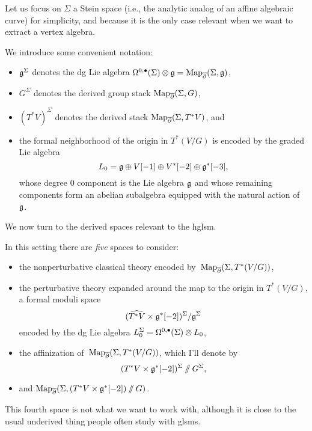 \documentclass[11pt]{amsart}
\begin{document}
Let us focus on $\Sigma$ a Stein space (i.e., the analytic analog of an affine algebraic curve) 
for simplicity, and because it is the only case relevant when we want to extract a vertex algebra.

We introduce some convenient notation:
\begin{itemize}
\item $\mathfrak g^\Sigma$ denotes the dg Lie algebra $\Omega^{0,\bullet}(\Sigma) \otimes \mathfrak g = {\rm Map}_{\overline{\partial}}(\Sigma,\mathfrak g)$,
\item $G^\Sigma$ denotes the derived group stack ${\rm Map}_{\overline{\partial}}(\Sigma,G)$, 
\item $(T^*V)^\Sigma$ denotes the derived stack ${\rm Map}_{\overline{\partial}}(\Sigma,T^*V)$,
and
\item the formal neighborhood of the origin in $T^*(V/G)$ is encoded by the graded Lie algebra
\[
L_0 = \mathfrak g \oplus V[-1] \oplus V^*[-2] \oplus \mathfrak g^*[-3],
\] 
whose degree 0 component is the Lie algebra $\mathfrak g$ and whose remaining components form an abelian subalgebra equipped with the natural action of~$\mathfrak g$.
\end{itemize}
We now turn to the derived spaces relevant to the hglsm.

In this setting there are {\em five} spaces to consider:
\begin{itemize}
\item the nonperturbative classical theory encoded by~${\rm Map}_{\overline{\partial}}(\Sigma, T^*(V/G))$,
\item the perturbative theory expanded around the map to the origin in $T^*(V/G)$, 
a formal moduli space 
\[
(\widehat{T^* V} \times \mathfrak g^*[-2])^\Sigma/\mathfrak g^\Sigma
\] 
encoded by the dg Lie algebra $L_0^\Sigma = \Omega^{0,\bullet}(\Sigma) \otimes L_0$, 
\item the affinization of~${\rm Map}_{\overline{\partial}}(\Sigma, T^*(V/G))$, which I'll denote by 
\[
(T^*V \times \mathfrak g^*[-2])^\Sigma \mathbin{/\mkern-6mu/} G^\Sigma,
\]
\item and ${\rm Map}_{\overline{\partial}}(\Sigma,(T^*V \times \mathfrak g^*[-2])\mathbin{/\mkern-6mu/} G)$.
\end{itemize}
This fourth space is not what we want to work with, 
although it is close to the usual underived thing people often study with glsms.
\end{document}

